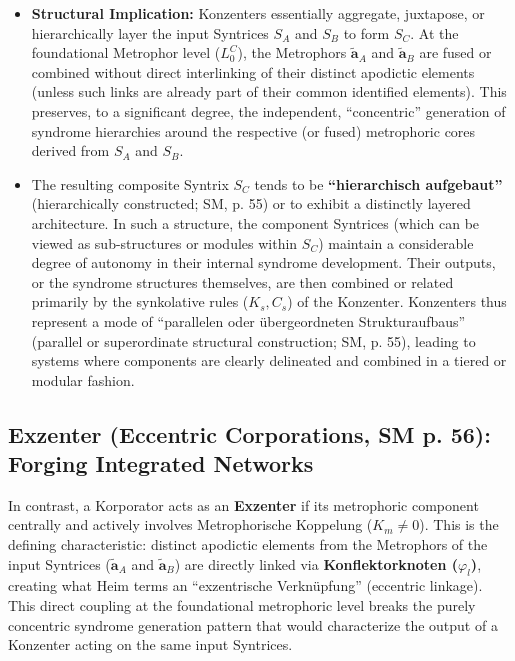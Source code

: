 \documentclass[
    12pt,              %
    a4paper,           %
    headings=normal,   %
    twoside=true,      %
    BCOR=8mm,          %
]{scrbook}
\newcommand{\q}[1]{\enquote{#1}}
\newcommand{\metrophor}{\bm{\widetilde{a}}}
\begin{document}
\begin{itemize}
    \item   \textbf{Structural Implication:} Konzenters essentially aggregate, juxtapose, or hierarchically layer the input Syntrices \(S_A\) and \(S_B\) to form \(S_C\). At the foundational Metrophor level (\(L_0^C\)), the Metrophors \(\metrophor_A\) and \(\metrophor_B\) are fused or combined without direct interlinking of their distinct apodictic elements (unless such links are already part of their common identified elements). This preserves, to a significant degree, the independent, \q{concentric} generation of syndrome hierarchies around the respective (or fused) metrophoric cores derived from \(S_A\) and \(S_B\).
    \item   The resulting composite Syntrix \(S_C\) tends to be \textbf{\q{hierarchisch aufgebaut}} (hierarchically constructed; SM, p. 55) or to exhibit a distinctly layered architecture. In such a structure, the component Syntrices (which can be viewed as sub-structures or modules within \(S_C\)) maintain a considerable degree of autonomy in their internal syndrome development. Their outputs, or the syndrome structures themselves, are then combined or related primarily by the synkolative rules (\(K_s, C_s\)) of the Konzenter. Konzenters thus represent a mode of \q{parallelen oder übergeordneten Strukturaufbaus} (parallel or superordinate structural construction; SM, p. 55), leading to systems where components are clearly delineated and combined in a tiered or modular fashion.
\end{itemize}

\subsection{Exzenter (Eccentric Corporations, SM p. 56): Forging Integrated Networks}
\label{sec:ch3_exzenter_original} 

In contrast, a Korporator acts as an \textbf{Exzenter} if its metrophoric component centrally and actively involves Metrophorische Koppelung (\(K_m \neq 0\)). This is the defining characteristic: distinct apodictic elements from the Metrophors of the input Syntrices (\(\metrophor_A\) and \(\metrophor_B\)) are directly linked via \textbf{Konflektorknoten (\(\varphi_l\))}, creating what Heim terms an \q{exzentrische Verknüpfung} (eccentric linkage). This direct coupling at the foundational metrophoric level breaks the purely concentric syndrome generation pattern that would characterize the output of a Konzenter acting on the same input Syntrices.
\end{document}
